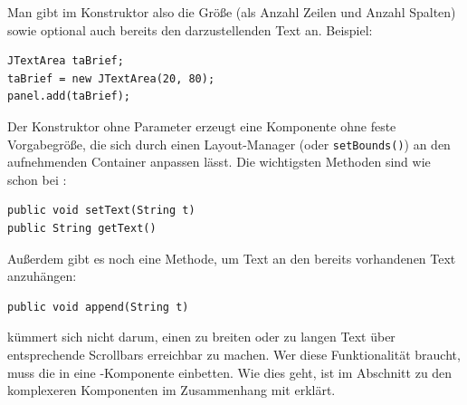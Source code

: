 Man gibt im Konstruktor also die Größe (als Anzahl Zeilen und Anzahl Spalten)
sowie optional auch bereits den darzustellenden Text an. Beispiel:

\begin{lstlisting}
JTextArea taBrief;
taBrief = new JTextArea(20, 80);
panel.add(taBrief);
\end{lstlisting}

Der Konstruktor ohne Parameter erzeugt eine Komponente ohne feste
Vorgabegröße, die sich durch einen Layout-Manager (oder \lstinline|setBounds()|)
an den aufnehmenden Container anpassen lässt. Die wichtigsten Methoden sind wie
schon bei :

\begin{lstlisting}
public void setText(String t)
public String getText()
\end{lstlisting}

Außerdem gibt es noch eine Methode, um Text an den bereits vorhandenen Text
anzuhängen:

\begin{lstlisting}
public void append(String t)
\end{lstlisting}

 kümmert sich nicht darum, einen zu breiten oder zu langen
Text über entsprechende Scrollbars erreichbar zu machen. Wer diese
Funktionalität braucht, muss die  in eine
-Komponente einbetten. Wie dies geht, ist im Abschnitt zu
den komplexeren Komponenten im Zusammenhang mit  erklärt.

